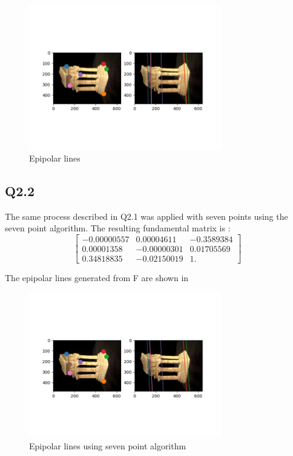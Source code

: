 \documentclass[12pt]{article}
\begin{document}
\begin{figure}[H]
\centering
\includegraphics[page=1,width=0.75\textwidth]{q2_1}
\caption{ Epipolar lines  } 
\label{fig:fepipolar}
\end{figure}   

\newpage
\subsection{Q2.2}


The same process described in Q2.1 was applied with seven points using the seven point algorithm. The resulting fundamental matrix is :
$$
\begin{bmatrix}
-0.00000557  &  0.00004611  & -0.3589384 \\
0.00001358   & -0.00000301  &  0.01705569 \\
0.34818835   & -0.02150019  &  1.        
\end{bmatrix}
$$

The epipolar lines generated from F are shown in 

\begin{figure}[H]
\centering
\includegraphics[page=1,width=0.75\textwidth]{q2_2}
\caption{ Epipolar lines using seven point algorithm } 
\label{fig:fepipolar7}
\end{figure}   
\end{document}
